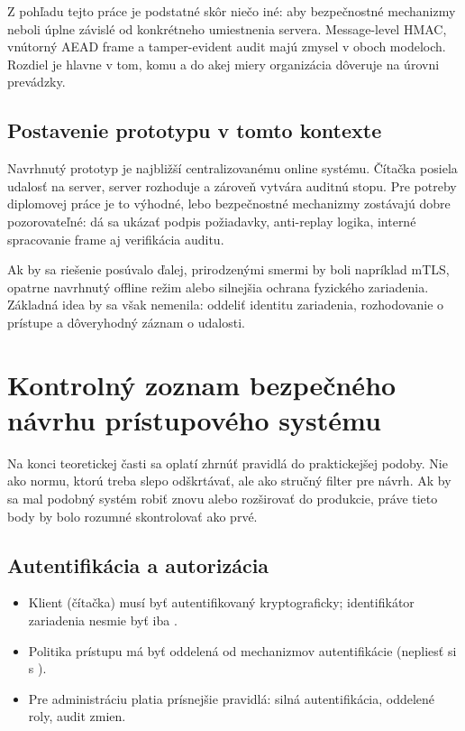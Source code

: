\documentclass[journal,a4paper,onecolumn]{IEEEtran}
\begin{document}
Z pohľadu tejto práce je podstatné skôr niečo iné: aby bezpečnostné mechanizmy neboli úplne závislé od konkrétneho umiestnenia servera. Message-level HMAC, vnútorný AEAD frame a tamper-evident audit majú zmysel v oboch modeloch. Rozdiel je hlavne v tom, komu a do akej miery organizácia dôveruje na úrovni prevádzky.
\subsection{Postavenie prototypu v tomto kontexte}

Navrhnutý prototyp je najbližší centralizovanému online systému. Čítačka posiela udalosť na server, server rozhoduje a zároveň vytvára auditnú stopu. Pre potreby diplomovej práce je to výhodné, lebo bezpečnostné mechanizmy zostávajú dobre pozorovateľné: dá sa ukázať podpis požiadavky, anti-replay logika, interné spracovanie frame aj verifikácia auditu.

Ak by sa riešenie posúvalo ďalej, prirodzenými smermi by boli napríklad mTLS, opatrne navrhnutý offline režim alebo silnejšia ochrana fyzického zariadenia. Základná idea by sa však nemenila: oddeliť identitu zariadenia, rozhodovanie o prístupe a dôveryhodný záznam o udalosti.


\section{Kontrolný zoznam bezpečného návrhu prístupového systému}

Na konci teoretickej časti sa oplatí zhrnúť pravidlá do praktickejšej podoby. Nie ako normu, ktorú treba slepo odškrtávať, ale ako stručný filter pre návrh. Ak by sa mal podobný systém robiť znovu alebo rozširovať do produkcie, práve tieto body by bolo rozumné skontrolovať ako prvé.

\subsection{Autentifikácia a autorizácia}

\begin{itemize}[leftmargin=*,itemsep=2pt]
  \item Klient (čítačka) musí byť autentifikovaný kryptograficky; identifikátor zariadenia nesmie byť iba .
  \item Politika prístupu má byť oddelená od mechanizmov autentifikácie (nepliesť si  s ).
  \item Pre administráciu platia prísnejšie pravidlá: silná autentifikácia, oddelené roly, audit zmien.
\end{itemize}
\end{document}
